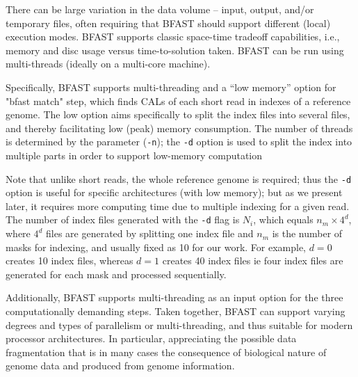 \documentclass{acm_proc_article-sp}
\begin{document}
There can be large variation in the data volume -- input, output,
and/or temporary files, often requiring that BFAST should support
different (local) execution modes.  BFAST supports classic space-time
tradeoff capabilities, i.e., memory and disc usage versus
time-to-solution taken. BFAST can be run using multi-threads (ideally
on a multi-core machine).

Specifically, BFAST supports multi-threading and a ``low memory''
option for "bfast match" step, which finds CALs of each short read in
indexes of a reference genome.  The low option aims specifically to
split the index files into several files, and thereby facilitating low
(peak) memory consumption.  The number of threads is determined by the
parameter (\texttt{-n}); the \texttt{-d} option is used to split the
index into multiple parts in order to support low-memory computation


Note that unlike short reads, the whole reference genome is required;
thus the \texttt{-d} option is useful for specific architectures (with
low memory); but as we present later, it requires more computing time
due to multiple indexing for a given read.  The number of index files
generated with the \texttt{-d} flag is $N_i$, which equals $n_m \times
4^d$, where $4^d$ files are generated by splitting one index file and
$n_m$ is the number of masks for indexing, and usually fixed as 10 for
our work.  For example, $d=0$ creates 10 index files, whereas $d=1$
creates 40 index files ie four index files are generated for each mask
and processed sequentially.  

Additionally, BFAST supports multi-threading as an input option for
the three computationally demanding steps.  Taken together, BFAST can
support varying degrees and types of parallelism or multi-threading,
and thus suitable for modern processor architectures.  In particular,
appreciating the possible data fragmentation that is in many cases the
consequence of biological nature of genome data and produced from
genome information.
\end{document}

